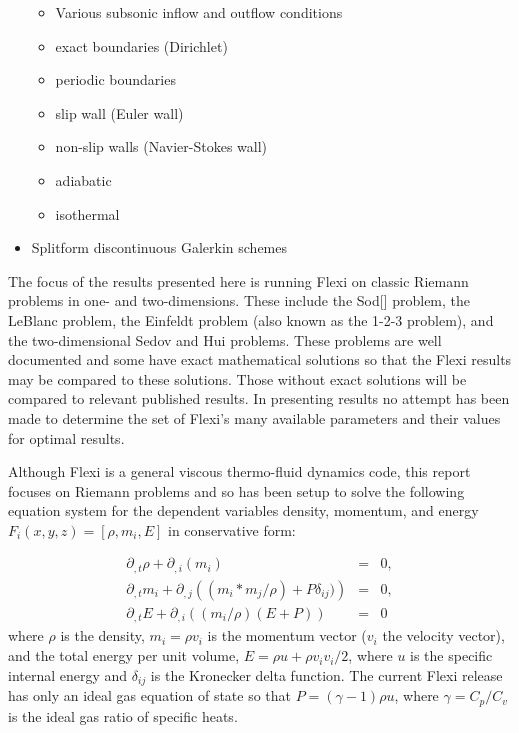 \begin{itemize}
   \begin{itemize}
    \item Various subsonic inflow and outflow conditions
    \item exact boundaries (Dirichlet)
    \item periodic boundaries
    \item slip wall (Euler wall)
    \item non-slip walls (Navier-Stokes wall)
    \item adiabatic
    \item isothermal
    \end{itemize}
  \item Splitform discontinuous Galerkin schemes
\end{itemize}

The focus of the results presented here is running Flexi on classic Riemann problems in one- and two-dimensions. These include the Sod[\cite{sod1,sod2}] problem, the LeBlanc problem,  the Einfeldt problem (also known as the 1-2-3 problem)\cite{einfeldt}, and the two-dimensional Sedov\cite{Sedov} and Hui\cite{Hui} problems.  These problems are well documented and some have exact mathematical solutions so that the Flexi results may be compared to these solutions.  Those without exact solutions will be compared to relevant published results.  In presenting results no attempt has been made to determine the set of Flexi's many available parameters and their values for optimal results.

Although Flexi is a general viscous thermo-fluid dynamics code, this report focuses on Riemann problems and so has been setup to solve the following equation system for the dependent variables density, momentum, and energy $F_i(x, y, z) = [\rho, m_i, E]$ in conservative form:

\begin{eqnarray}
 \partial_{,t} \rho + \partial_{,i} \left( m_i \right) & = & 0, \\
 \partial_{,t} m_i + \partial_{,j} \left( (m_i*m_j/\rho) + P \delta_{ij}) \right) & = & 0, \\
 \partial_{,t} E + \partial_{,i} \left( (m_i/\rho)(E + P) \right) & = & 0
\end{eqnarray}
\noindent where $\rho$ is the density, $m_i = \rho v_i$ is the momentum vector ($v_i$ the velocity vector), and the total energy per unit volume, $E = \rho u + \rho v_i v_i/2$, where $u$ is the specific internal energy and $\delta_{ij}$ is the Kronecker delta function.  The current Flexi release has only an ideal gas equation of state so that $P = (\gamma - 1) \rho u$, where $\gamma = C_p/C_v$ is the ideal gas ratio of specific heats.


